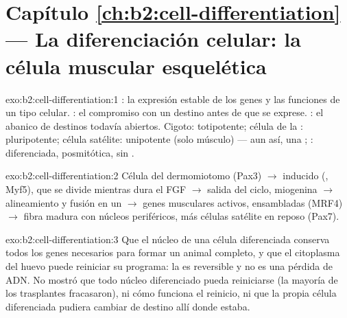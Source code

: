 \section*{Capítulo \ref{ch:b2:cell-differentiation} --- La diferenciación celular: la célula muscular esquelética}

\begin{solution}{exo:b2:cell-differentiation:1}
: la expresión estable de los genes y las funciones de un
tipo celular. : el compromiso con un destino antes de que se
exprese. : el abanico de destinos todavía abiertos. Cigoto:
totipotente; célula de la : pluripotente; célula
satélite: unipotente (solo músculo) --- aun así, una ; : diferenciada, posmitótica, sin .
\end{solution}

\begin{solution}{exo:b2:cell-differentiation:2}
Célula del dermomiotomo (Pax3) $\to$  inducido (, Myf5),
que se divide mientras dura el FGF $\to$ salida del ciclo, miogenina $\to$
alineamiento y fusión en un  $\to$ genes musculares activos,
 ensambladas (MRF4) $\to$ fibra madura con núcleos
periféricos, más células satélite en reposo (Pax7).
\end{solution}

\begin{solution}{exo:b2:cell-differentiation:3}
Que el núcleo de una célula diferenciada conserva todos los genes
necesarios para formar un animal completo, y que el citoplasma del huevo
puede reiniciar su programa: la  es reversible y no es una
pérdida de ADN. No mostró que todo núcleo diferenciado pueda
reiniciarse (la mayoría de los trasplantes fracasaron), ni cómo funciona
el reinicio, ni que la propia célula diferenciada pudiera cambiar de
destino allí donde estaba.
\end{solution}

